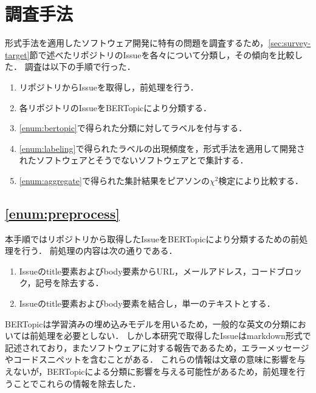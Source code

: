 \documentclass[main]{subfiles}
\begin{document}
\chapter{調査手法}

形式手法を適用したソフトウェア開発に特有の問題を調査するため，\ref{sec:survey-target}節で述べたリポジトリのIssueを各々について分類し，その傾向を比較した．
調査は以下の手順で行った．

\begin{enumerate}[label=手順\arabic*.]
	\item \label{enum:preprocess}
	      リポジトリからIssueを取得し，前処理を行う．
	\item \label{enum:bertopic}
	      各リポジトリのIssueをBERTopicにより分類する．
	\item \label{enum:labeling}
	      \ref{enum:bertopic}で得られた分類に対してラベルを付与する．
	\item \label{enum:aggregate}
	      \ref{enum:labeling}で得られたラベルの出現頻度を，形式手法を適用して開発されたソフトウェアとそうでないソフトウェアとで集計する．
	\item \label{enum:statistical}
	      \ref{enum:aggregate}で得られた集計結果をピアソンの\(\chi^2\)検定により比較する．
\end{enumerate}

\section{\ref{enum:preprocess}}
\label{sec:preprocess}

本手順ではリポジトリから取得したIssueをBERTopicにより分類するための前処理を行う．
前処理の内容は次の通りである．

\begin{enumerate}
	\item \label{enum:filter}
	      Issueのtitle要素およびbody要素からURL，メールアドレス，コードブロック，記号を除去する．
	\item \label{enum:lowercase}
	      Issueのtitle要素およびbody要素を結合し，単一のテキストとする．
\end{enumerate}

BERTopicは学習済みの埋め込みモデルを用いるため，一般的な英文の分類においては前処理を必要としない．
しかし本研究で取得したIssueはmarkdown形式で記述されており，またソフトウェアに対する報告であるため，エラーメッセージやコードスニペットを含むことがある．
これらの情報は文章の意味に影響を与えないが，BERTopicによる分類に影響を与える可能性があるため，前処理を行うことでこれらの情報を除去した．
\end{document}
